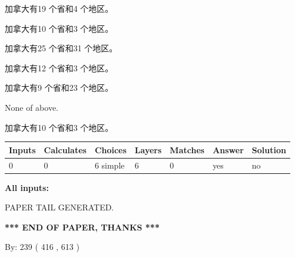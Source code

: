 \documentclass{ctexart}
\begin{document}
 
加拿大有19 个省和4 个地区。
 
 
加拿大有10 个省和3 个地区。
 
 
加拿大有25 个省和31 个地区。
 
 
加拿大有12 个省和3 个地区。
 
 
加拿大有9 个省和23 个地区。
 
 
 None of above.
 
 
\noindent{}
 
 
加拿大有10 个省和3 个地区。
 
 
\noindent{}
 
 
   
   
   
   
\noindent\begin{tabular}{|l|l|l|l|l|l|l|}
 \hline
Inputs & Calculates & Choices & Layers & Matches & Answer & Solution \\ \hline
 0  & 
 0  & 
 6
  simple  
  & 
 6  & 
 0  & 
  yes & 
  no 
  \\ \hline
 \end{tabular}
   
   
   
   
\noindent{}
   
   
   
   
\noindent\vspace{0.1in}\hspace{-0.08in} {\textbf{\Large{All inputs: }}}
   
   
   
   
   
   
 \vspace{0.2in}
 
   
   
\vspace{2.0in} PAPER TAIL GENERATED.
   
   
   
   
\vspace{1.0in} 
{\textbf{\large{ *** END OF PAPER, THANKS *** }}} 
   
   
\hspace{1.0in} By: 
 239 ( 416 ,  613 )
   
\end{document}
